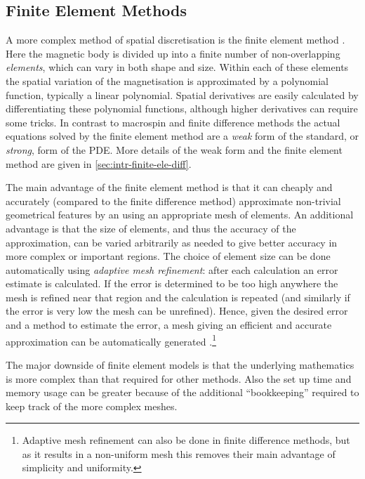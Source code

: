 \subsection{Finite Element Methods}
\label{sec:sd-finite-elem-meth}

A more complex method of spatial discretisation is the finite element method \cite{HowardElmanDavidSilvester2006}.
Here the magnetic body is divided up into a finite number of non-overlapping \emph{elements}, which can vary in both shape and size.
Within each of these elements the spatial variation of the magnetisation is approximated by a polynomial function, typically a linear polynomial.
Spatial derivatives are easily calculated by differentiating these polynomial functions, although higher derivatives can require some tricks.
In contrast to macrospin and finite difference methods the actual equations solved by the finite element method are a \emph{weak} form of the standard, or \emph{strong}, form of the PDE.
More details of the weak form and the finite element method are given in \cref{sec:intr-finite-ele-diff}.

The main advantage of the finite element method is that it can cheaply and accurately (compared to the finite difference method) approximate non-trivial geometrical features by an using an appropriate mesh of elements.
An additional advantage is that the size of elements, and thus the accuracy of the approximation, can be varied arbitrarily as needed to give better accuracy in more complex or important regions.
The choice of element size can be done automatically using \emph{adaptive mesh refinement}: after each calculation an error estimate is calculated.
If the error is determined to be too high anywhere the mesh is refined near that region and the calculation is repeated (and similarly if the error is very low the mesh can be unrefined).
Hence, given the desired error and a method to estimate the error, a mesh giving an efficient and accurate approximation can be automatically generated \cite{Schrefl1999}.\footnote{Adaptive mesh refinement can also be done in finite difference methods, but as it results in a non-uniform mesh this removes their main advantage of simplicity and uniformity.}

The major downside of finite element models is that the underlying mathematics is more complex than that required for other methods.
Also the set up time and memory usage can be greater because of the additional ``bookkeeping'' required to keep track of the more complex meshes.


